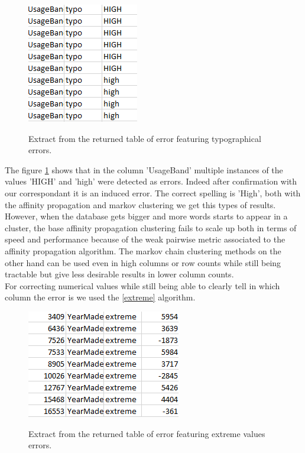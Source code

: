 \documentclass{article}
\begin{document}
\begin{figure}[h]
    \centering
    \includegraphics[scale=0.8]{picture/exp_typo.png}
    \label{fig:exp_typo}
    \caption{Extract from the returned table of error featuring typographical errors.}
\end{figure}
The figure \ref{fig:exp_typo} shows that in the column 'UsageBand' multiple instances of the values 'HIGH' and 'high' were detected as errors. Indeed after confirmation with our correspondant it is an induced error. The correct spelling is 'High', both with the affinity propagation and markov clustering we get this types of results. However, when the database gets bigger and more words starts to appear in a cluster, the base affinity propagation clustering fails to scale up both in terms of speed and performance because of the weak pairwise metric associated to the affinity propagation algorithm. The markov chain clustering methods on the other hand can be used even in high columns or row counts while still being tractable but give less desirable results in lower column counts. \\

For correcting numerical values while still being able to clearly tell in which column the error is we used the \ref{extreme} algorithm.

\begin{figure}[h]
    \centering
    \includegraphics[scale=0.8]{picture/exp_extreme.png}
    \label{fig:exp_extreme}
    \caption{Extract from the returned table of error featuring extreme values errors.}
\end{figure}
\end{document}
